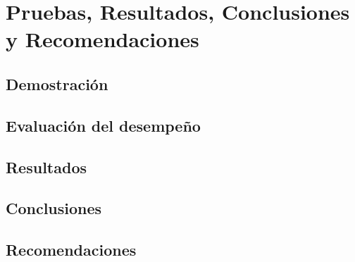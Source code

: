 \chapter{Pruebas, Resultados, Conclusiones y Recomendaciones}\label{ch:pruebas}


\section{Demostración}\label{sec:demostracion}


\section{Evaluación del desempeño}\label{sec:evaluacion-del-desempeno}


\section{Resultados}\label{sec:resultados}


\section{Conclusiones}\label{sec:conclusiones}


\section{Recomendaciones}\label{sec:recomendaciones}
